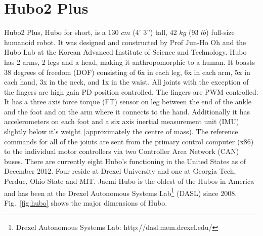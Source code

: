 \section{Hubo2 Plus}
Hubo2 Plus, Hubo for short, is a 130 $cm$ (4' 3'') tall, 42 $kg$ (93 $lb$) full-size humanoid robot.  
It was designed and constructed by Prof Jun-Ho Oh and the Hubo Lab at the Korean Advanced Institute of Science and Technology\cite{hubo-first}.
Hubo has 2 arms, 2 legs and a head, making it anthropomorphic to a human.  
It boasts 38 degrees of freedom (DOF) consisting of 6x in each leg, 6x in each arm, 5x in each hand, 3x in the neck, and 1x in the waist.
All joints with the exception of the fingers are high gain PD position controlled.
The fingers are PWM controlled.
It has a three axis force torque (FT) sensor on leg between the end of the ankle and the foot and on the arm where it connects to the hand.
Additionally it has accelerometers on each foot and a six axis inertial measurement unit (IMU) slightly below it's weight (approximately the centre of mass).
The reference commands for all of the joints are sent from the primary control computer (x86) to the individual motor controllers via two Controller Area Network (CAN) buses.
There are currently eight Hubo's functioning in the United States as of December 2012.
Four reside at Drexel University and one at Georgia Tech, Perdue, Ohio State and MIT.
Jaemi Hubo is the oldest of the Hubos in America and has been at the Drexel Autonomous Systems Lab\footnote{Drexel Autonomous Systems Lab: http://dasl.mem.drexel.edu/} (DASL) since 2008\cite{jaemiHuboSRM}.
Fig.~\ref{fig:hubo} shows the major dimensions of Hubo.

